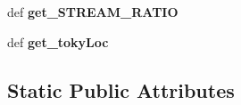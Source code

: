 \begin{DoxyCompactItemize}
\item 
\hypertarget{classsmoderp2d_1_1src_1_1main__classes_1_1General_1_1Globals_ab183cbe4c6b5b3ac1b4c9b1d65180ef2}{def {\bfseries get\-\_\-\-S\-T\-R\-E\-A\-M\-\_\-\-R\-A\-T\-I\-O}}\label{classsmoderp2d_1_1src_1_1main__classes_1_1General_1_1Globals_ab183cbe4c6b5b3ac1b4c9b1d65180ef2}

\item 
\hypertarget{classsmoderp2d_1_1src_1_1main__classes_1_1General_1_1Globals_aeeced572deac2a2bbaa9890fae510247}{def {\bfseries get\-\_\-toky\-Loc}}\label{classsmoderp2d_1_1src_1_1main__classes_1_1General_1_1Globals_aeeced572deac2a2bbaa9890fae510247}

\end{DoxyCompactItemize}
\subsection*{Static Public Attributes}
